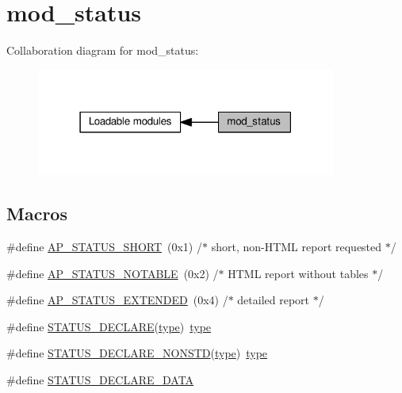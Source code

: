 \hypertarget{group__MOD__STATUS}{}\section{mod\+\_\+status}
\label{group__MOD__STATUS}
Collaboration diagram for mod\+\_\+status\+:
\nopagebreak
\begin{figure}[H]
\begin{center}
\leavevmode
\includegraphics[width=279pt]{group__MOD__STATUS}
\end{center}
\end{figure}
\subsection*{Macros}
\begin{DoxyCompactItemize}
\item 
\#define \hyperlink{group__MOD__STATUS_ga53eb2bf6c20289a6628ae917614b92f8}{A\+P\+\_\+\+S\+T\+A\+T\+U\+S\+\_\+\+S\+H\+O\+RT}~(0x1)  /$\ast$ short, non-\/\+H\+T\+M\+L report requested $\ast$/
\item 
\#define \hyperlink{group__MOD__STATUS_gaa5251b7727bf7bb2eed8ec9c0514ddf3}{A\+P\+\_\+\+S\+T\+A\+T\+U\+S\+\_\+\+N\+O\+T\+A\+B\+LE}~(0x2)  /$\ast$ H\+T\+M\+L report without tables $\ast$/
\item 
\#define \hyperlink{group__MOD__STATUS_ga5b20ec8a213cfdf77c2e0b80a0e270fa}{A\+P\+\_\+\+S\+T\+A\+T\+U\+S\+\_\+\+E\+X\+T\+E\+N\+D\+ED}~(0x4)  /$\ast$ detailed report $\ast$/
\item 
\#define \hyperlink{group__MOD__STATUS_ga3d15ba4c256c41a8bbbd8f12285918ef}{S\+T\+A\+T\+U\+S\+\_\+\+D\+E\+C\+L\+A\+RE}(\hyperlink{pcre_8txt_a2463fbbe8b0c90b90db12195e1edaa5d}{type})~\hyperlink{pcre_8txt_a2463fbbe8b0c90b90db12195e1edaa5d}{type}
\item 
\#define \hyperlink{group__MOD__STATUS_gadf842ebf212a31fbb01c18c1a041a425}{S\+T\+A\+T\+U\+S\+\_\+\+D\+E\+C\+L\+A\+R\+E\+\_\+\+N\+O\+N\+S\+TD}(\hyperlink{pcre_8txt_a2463fbbe8b0c90b90db12195e1edaa5d}{type})~\hyperlink{pcre_8txt_a2463fbbe8b0c90b90db12195e1edaa5d}{type}
\item 
\#define \hyperlink{group__MOD__STATUS_gac6e6730e481f88620b39cadd1db80093}{S\+T\+A\+T\+U\+S\+\_\+\+D\+E\+C\+L\+A\+R\+E\+\_\+\+D\+A\+TA}
\end{DoxyCompactItemize}


